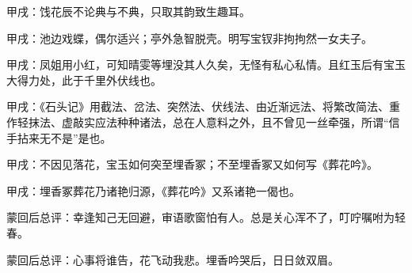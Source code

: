 \begin{parag}
    \begin{note}甲戌：饯花辰不论典与不典，只取其韵致生趣耳。\end{note}
\end{parag}


\begin{parag}
    \begin{note}甲戌：池边戏蝶，偶尔适兴；亭外急智脱壳。明写宝钗非拘拘然一女夫子。\end{note}
\end{parag}


\begin{parag}
    \begin{note}甲戌：凤姐用小红，可知晴雯等埋没其人久矣，无怪有私心私情。且红玉后有宝玉大得力处，此于千里外伏线也。\end{note}
\end{parag}


\begin{parag}
    \begin{note}甲戌：《石头记》用截法、岔法、突然法、伏线法、由近渐远法、将繁改简法、重作轻抹法、虚敲实应法种种诸法，总在人意料之外，且不曾见一丝牵强，所谓“信手拈来无不是”是也。\end{note}
\end{parag}


\begin{parag}
    \begin{note}甲戌：不因见落花，宝玉如何突至埋香冢；不至埋香冢又如何写《葬花吟》。\end{note}
\end{parag}


\begin{parag}
    \begin{note}甲戌：埋香冢葬花乃诸艳归源，《葬花吟》又系诸艳一偈也。\end{note}
\end{parag}


\begin{parag}
    \begin{note}蒙回后总评：幸逢知己无回避，审语歌窗怕有人。总是关心浑不了，叮咛嘱咐为轻春。\end{note}
\end{parag}


\begin{parag}
    \begin{note}蒙回后总评：心事将谁告，花飞动我悲。埋香吟哭后，日日敛双眉。\end{note}
\end{parag}

